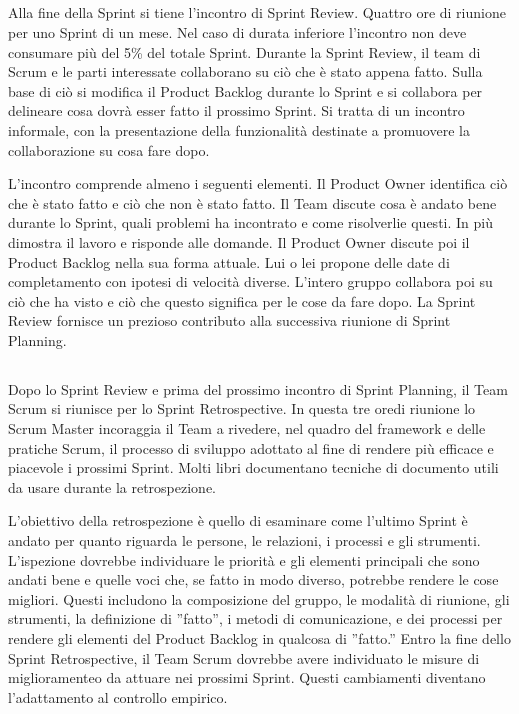 \subsection*{\color{Blue}{SPRINT REVIEW}}
\label{sec:sprintreview}
Alla fine della Sprint si tiene l'incontro di Sprint Review. Quattro ore di riunione per uno Sprint di un mese. Nel
caso di durata inferiore l'incontro non deve consumare pi\`u del 5\% del totale Sprint. Durante la Sprint Review, il
team di Scrum e le parti interessate collaborano su ci\`o che \`e stato appena fatto. Sulla base di ci\`o si modifica
il Product Backlog durante lo Sprint e si collabora per delineare cosa dovr\`a esser fatto il prossimo Sprint. Si
tratta di un incontro informale, con la presentazione della funzionalit\`a destinate a promuovere la collaborazione su
cosa fare dopo. 
\newline

L'incontro comprende almeno i seguenti elementi. Il Product Owner identifica ci\`o che \`e stato fatto e ci\`o che non
\`e stato fatto. Il Team discute cosa \`e andato bene durante lo Sprint, quali problemi ha incontrato e come
risolverlie questi. In pi\`u dimostra il lavoro e risponde alle domande. Il Product Owner discute poi il Product
Backlog nella sua forma attuale. Lui o lei propone delle date di completamento con ipotesi di velocit\`a diverse.
L'intero gruppo collabora poi su ci\`o che ha visto e ci\`o che questo significa per le cose da fare dopo. La Sprint
Review fornisce un prezioso contributo alla successiva riunione di Sprint Planning.

\subsection*{\color{Blue}{SPRINT RETROSPECTIVE}}
\label{sec:sprintretrospective}
Dopo lo Sprint Review e prima del prossimo incontro di Sprint Planning, il Team Scrum si riunisce per lo Sprint
Retrospective. In questa tre oredi riunione lo Scrum Master incoraggia il Team a rivedere, nel quadro del framework e
delle pratiche Scrum, il processo di sviluppo adottato al fine di rendere pi\`u efficace e piacevole i prossimi Sprint.
Molti libri documentano tecniche di documento utili da usare durante la retrospezione.
\newline

L'obiettivo della retrospezione \`e quello di esaminare come l'ultimo Sprint \`e andato per quanto riguarda le persone,
le relazioni, i processi e gli strumenti. L'ispezione dovrebbe individuare le priorit\`a e gli elementi principali che
sono andati bene e quelle voci che, se fatto in modo diverso, potrebbe rendere le cose migliori. Questi includono la
composizione del gruppo, le modalit\`a di riunione, gli strumenti, la definizione di ''fatto'', i metodi di
comunicazione, e dei processi per rendere gli elementi del Product Backlog in qualcosa di ''fatto.'' Entro la fine
dello Sprint Retrospective, il Team Scrum dovrebbe avere individuato le misure di miglioramenteo da attuare nei
prossimi Sprint. Questi cambiamenti diventano l'adattamento al controllo empirico.


